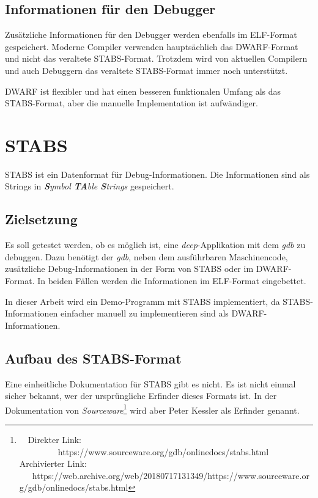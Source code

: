 \subsection{Informationen für den Debugger}
Zusätzliche Informationen für den Debugger werden ebenfalls im ELF-Format gespeichert.
Moderne Compiler verwenden hauptsächlich das DWARF-Format und nicht das veraltete STABS-Format.
Trotzdem wird von aktuellen Compilern und auch Debuggern das veraltete STABS-Format immer noch unterstützt.

DWARF ist flexibler und hat einen besseren funktionalen Umfang als das STABS-Format, aber die manuelle Implementation ist aufwändiger.





\section{STABS}
\label{label:stabs}
STABS ist ein Datenformat für Debug-Informationen.
Die Informationen sind als Strings in \textit{\textbf{S}ymbol \textbf{TA}ble \textbf{S}trings} gespeichert.

\subsection{Zielsetzung}
Es soll getestet werden, ob es möglich ist, eine \textit{deep}-Applikation mit dem \textit{gdb} zu debuggen.
Dazu benötigt der \textit{gdb}, neben dem ausführbaren Maschinencode, zusätzliche Debug-Informationen in der Form von STABS oder im DWARF-Format.
In beiden Fällen werden die Informationen im ELF-Format eingebettet.

In dieser Arbeit wird ein Demo-Programm mit STABS implementiert, da STABS-Informationen einfacher manuell zu implementieren sind als DWARF-Informationen.


\subsection{Aufbau des STABS-Format}
Eine einheitliche Dokumentation für STABS gibt es nicht.
Es ist nicht einmal sicher bekannt, wer der ursprüngliche Erfinder dieses Formats ist.
In der Dokumentation von \textit{Sourceware}\footnote{\ \ Direkter Link: \ \ \ \ \ \ \ \ \ https://www.sourceware.org/gdb/onlinedocs/stabs.html\\ Archivierter Link: \ \ \ https://web.archive.org/web/20180717131349/https://www.sourceware.org/gdb/onlinedocs/stabs.html} wird aber Peter Kessler als Erfinder genannt.

